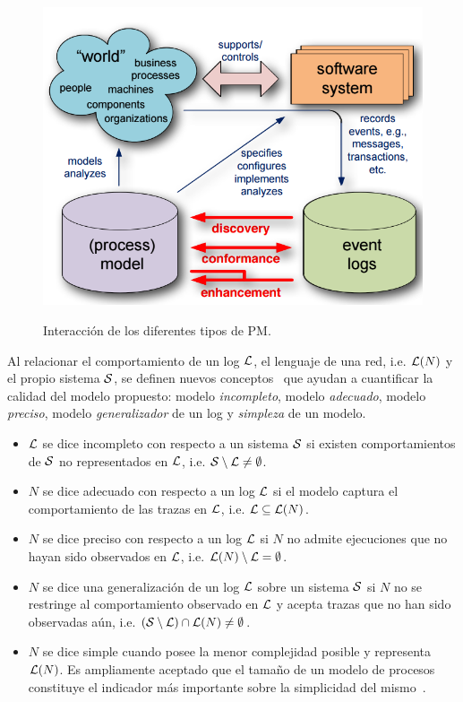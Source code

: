 \begin{figure}[h]
  	\centering
    \includegraphics[scale=0.5]{img/pmcycle.png}\\
    \caption{Interacción de los diferentes tipos de PM.}
    \label{fig:pmcycle}
\end{figure}

Al relacionar el comportamiento de un log ${\mathcal L}$, el lenguaje de una red, i.e. $\mathcal{L}(N)$ y 
el propio sistema $\mathcal{S}$, se definen nuevos conceptos~\cite{BuijsDA14}
que ayudan a cuantificar la calidad del modelo propuesto: modelo \emph{incompleto},
modelo \emph{adecuado}, modelo \emph{preciso}, modelo \emph{generalizador} de un log y \emph{simpleza} de un modelo.

\begin{itemize}
  \item ${\mathcal L}$ se dice incompleto con respecto a un sistema $\mathcal{S}$ si existen comportamientos
        de $\mathcal{S}$ no representados en ${\mathcal L}$, i.e. ${\mathcal{S}} \setminus {\mathcal L} \ne \emptyset$.
  \item $N$ se dice adecuado con respecto a un log ${\mathcal L}$ si el modelo captura el comportamiento 
        de las trazas en ${\mathcal L}$, i.e. ${\mathcal L} \subseteq \mathcal{L}(N)$.
  \item $N$ se dice preciso con respecto a un log ${\mathcal L}$ si $N$ no admite ejecuciones que no hayan
        sido observados en ${\mathcal L}$, i.e. $\mathcal{L}(N) \setminus {\mathcal L} = \emptyset$.
  \item $N$ se dice una generalización de un log ${\mathcal L}$ sobre un sistema $\mathcal{S}$ si $N$
        no se restringe al comportamiento observado en ${\mathcal L}$ y acepta trazas que no han sido observadas aún,
        i.e. $({\mathcal{S}} \setminus {\mathcal L}) \cap \mathcal{L}(N) \neq \emptyset$.
  \item $N$ se dice simple cuando posee la menor complejidad posible y representa $\mathcal{L}(N)$.
        Es ampliamente aceptado que el tamaño de un modelo de procesos constituye el indicador más importante
        sobre la simplicidad del mismo~\cite{AalstBook,Aalst2012,LeonRCHH15,CarmonaC14}.
\end{itemize}

